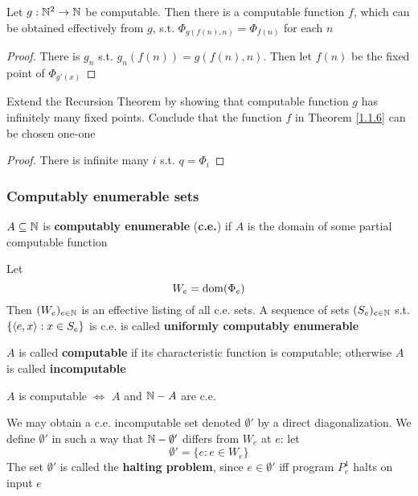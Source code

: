\documentclass[11pt]{article}
\begin{document}
\begin{theorem}
\label{1.1.6}
Let \(g:\mathbb{N}^2\to\mathbb{N}\) be computable. Then there is a computable function \(f\), which can be obtained
effectively from \(g\), s.t. \(\Phi_{g(f(n),n)}=\Phi_{f(n)}\) for each \(n\)
\end{theorem}

\begin{proof}
There is \(g_n\) s.t. \(g_n(f(n))=g(f(n),n)\). Then let \(f(n)\) be the fixed point of \(\Phi_{g'(x)}\)
\end{proof}

\begin{exercise}
\label{1.1.7}
Extend the Recursion Theorem by showing that computable function \(g\) has infinitely many fixed
points. Conclude that the function \(f\) in Theorem \ref{1.1.6} can be chosen one-one
\end{exercise}

\begin{proof}
There is infinite many \(i\) s.t. \(q=\Phi_i\)
\end{proof}
\subsubsection{Computably enumerable sets}
\label{sec:org6d0ed29}
\begin{definition}[]
\(A\subseteq\mathbb{N}\) is \textbf{computably enumerable} (\textbf{c.e.}) if \(A\) is the domain of some partial computable function
\end{definition}

Let
\begin{equation*}
W_e=\operatorname{dom}(\Phi_e)
\end{equation*}
Then \((W_e)_{e\in\mathbb{N}}\) is an effective listing of all c.e. sets. A sequence of sets \((S_e)_{e\in\mathbb{N}}\)
s.t. \(\{\langle e,x\rangle:x\in S_e\}\) is c.e. is called \textbf{uniformly computably enumerable}

\(A\) is called \textbf{computable} if its characteristic function is computable; otherwise \(A\) is
called \textbf{incomputable}

\begin{proposition}[]
\(A\) is computable \(\Leftrightarrow\) \(A\) and \(\mathbb{N}-A\) are c.e.
\end{proposition}

We may obtain a c.e. incomputable set denoted \(\emptyset'\) by a direct diagonalization. We
define \(\emptyset'\) in such a way that \(\mathbb{N}-\emptyset'\) differs from \(W_e\) at \(e\): let
\begin{equation*}
\emptyset'=\{e:e\in W_e\}
\end{equation*}
The set \(\emptyset'\) is called the \textbf{halting problem}, since \(e\in\emptyset'\) iff program \(P_e^1\) halts on input \(e\)
\end{document}
